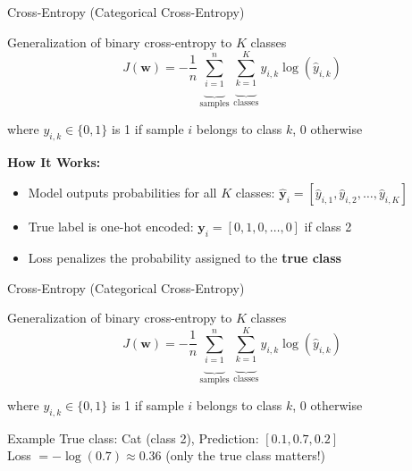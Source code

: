 \begin{frame}{Cross-Entropy (Categorical Cross-Entropy)}
    \begin{tcolorbox}[colback=blue!5, colframe=blue!60, title=\textbf{Loss Function: Cross-Entropy}]
        Generalization of binary cross-entropy to $K$ classes
        \vspace{0.5em}
        $$
        J(\mathbf{w}) = - \frac{1}{n}\underbrace{\sum_{i=1}^{n}}_{\text{samples}}
        \underbrace{\sum_{k=1}^{K}}_{\text{classes}}
        y_{i,k}\log(\hat{y}_{i,k})
        $$

        \vspace{0.3em}
        \small where $y_{i,k} \in \{0,1\}$ is 1 if sample $i$ belongs to class $k$, 0 otherwise
    \end{tcolorbox}
    
    \textbf{How It Works:}
    \begin{itemize}
        \item Model outputs probabilities for all $K$ classes: $\hat{\mathbf{y}}_i = [\hat{y}_{i,1}, \hat{y}_{i,2}, \ldots, \hat{y}_{i,K}]$
        \item True label is one-hot encoded: $\mathbf{y}_i = [0, 1, 0, \ldots, 0]$ if class 2
        \item Loss penalizes the probability assigned to the \textbf{true class}
    \end{itemize}
\end{frame}


\begin{frame}{Cross-Entropy (Categorical Cross-Entropy)}
    \begin{tcolorbox}[colback=blue!5, colframe=blue!60, title=\textbf{Loss Function: Cross-Entropy}]
        Generalization of binary cross-entropy to $K$ classes
        \vspace{0.5em}
        $$
        J(\mathbf{w}) = - \frac{1}{n}\underbrace{\sum_{i=1}^{n}}_{\text{samples}}
        \underbrace{\sum_{k=1}^{K}}_{\text{classes}}
        y_{i,k}\log(\hat{y}_{i,k})
        $$

        \vspace{0.3em}
        \small where $y_{i,k} \in \{0,1\}$ is 1 if sample $i$ belongs to class $k$, 0 otherwise
    \end{tcolorbox}
    
    \vspace{0.5em}
    \begin{exampleblock}{Example}
        True class: Cat (class 2), Prediction: $[0.1, 0.7, 0.2]$\\
        Loss $= -\log(0.7) \approx 0.36$ (only the true class matters!)
    \end{exampleblock}
\end{frame}


